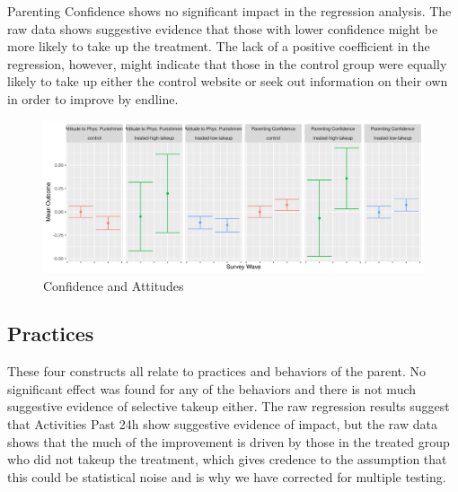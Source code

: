 \documentclass{article}
\begin{document}
Parenting Confidence shows no significant impact in the regression analysis. The raw data shows suggestive evidence that those with lower confidence might be more likely to take up the treatment. The lack of a positive coefficient in the regression, however, might indicate that those in the control group were equally likely to take up either the control website or seek out information on their own in order to improve by endline.


\begin{figure}[H]
  \centering
\includegraphics[width=\textwidth]{plots/pre_post/Pooled: Parenting Confidence.png}
\caption{Confidence and Attitudes}
\label{fig:confidence-and-attitudes-pre-post}
\end{figure}


\subsection*{Practices}

These four constructs all relate to practices and behaviors of the parent. No significant effect was found for any of the behaviors and there is not much suggestive evidence of selective takeup either. The raw regression results suggest that Activities Past 24h show suggestive evidence of impact, but the raw data shows that the much of the improvement is driven by those in the treated group who did not takeup the treatment, which gives credence to the assumption that this could be statistical noise and is why we have corrected for multiple testing.


\end{document}
